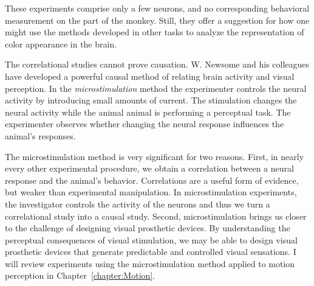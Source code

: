 These experiments comprise only a few neurons, and no corresponding
behavioral measurement on the part of the monkey.  Still, they offer a
suggestion for how one might use the methods developed in other tasks
to analyze the representation of color appearance in the brain.

The correlational studies cannot prove causation.
W. Newsome and his colleagues have developed a powerful causal method
of relating brain activity and visual perception.  In the {\em
microstimulation} method the experimenter controls the neural activity
by introducing small amounts of current.  The stimulation changes the neural
activity while the animal animal is performing a perceptual task.  The
experimenter observes whether changing the neural response
influences the animal's responses.

The microstimulation method is very significant for two reasons.
First, in nearly every other experimental procedure, we obtain a
correlation between a neural response and the animal's behavior.
Correlations are a useful form of evidence, but weaker than
experimental manipulation.  In microstimulation experiments, the
investigator controls the activity of the neurons and thus we turn a
correlational study into a causal study.  Second, microstimulation
brings us closer to the challenge of designing visual prosthetic
devices.  By understanding the perceptual consequences of visual
stimulation, we may be able to design visual prosthetic devices that
generate predictable and controlled visual sensations.  I will review
experiments using the microstimulation method applied to motion
perception in Chapter~\ref{chapter:Motion}.

